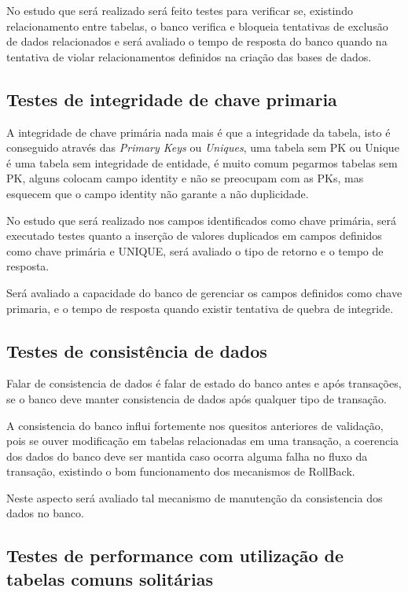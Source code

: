 No estudo que será realizado será feito testes para verificar se, existindo relacionamento entre tabelas, o banco verifica e bloqueia tentativas de exclusão de dados relacionados e será avaliado o tempo de resposta do banco quando na tentativa de violar relacionamentos definidos na criação das bases de dados.

\subsection{Testes de integridade de chave primaria}
\label{cha:intchave}

A integridade de chave primária nada mais é que a integridade da tabela, isto é conseguido através das \emph{Primary Keys} ou \emph{Uniques}, uma tabela sem PK ou Unique é uma tabela sem integridade de entidade, é muito comum pegarmos tabelas sem PK, alguns colocam campo identity e não se preocupam com as PKs, mas esquecem que o campo identity não garante a não duplicidade.

No estudo que será realizado nos campos identificados como chave primária, será executado testes quanto a inserção de valores duplicados em campos definidos como chave primária e UNIQUE, será avaliado o tipo de retorno e o tempo de resposta.

Será avaliado a capacidade do banco de gerenciar os campos definidos como chave primaria, e o tempo de resposta quando existir tentativa de quebra de integride.

\subsection{Testes de consistência de dados}
\label{cha:concistencia}

Falar de consistencia de dados é falar de estado do banco antes e após transações, se o banco deve manter consistencia de dados após qualquer tipo de transação.

A consistencia do banco influi fortemente nos quesitos anteriores de validação, pois se ouver modificação em tabelas relacionadas em uma transação, a coerencia dos dados do banco deve ser mantida caso ocorra alguma falha no fluxo da transação, existindo o bom funcionamento dos mecanismos de RollBack.

Neste aspecto será avaliado tal mecanismo de manutenção da consistencia dos dados no banco. 

\subsection{Testes de performance com utilização de tabelas comuns solitárias}
\label{cha:perfsimples}

